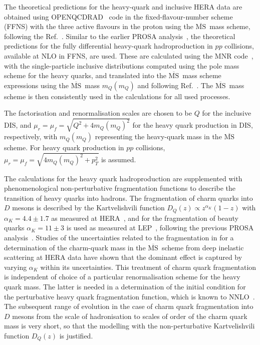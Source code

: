 \documentclass[12pt]{article}
\newcommand{\msbar}{$\overline{\text{MS}}\, $\xspace}
\begin{document}
The theoretical predictions for the heavy-quark and inclusive HERA data are obtained using OPENQCDRAD~\cite{openqcdrad} code in the 
fixed-flavour-number scheme (FFNS) with the three active flavours in the proton using the \msbar mass scheme, following the Ref.~\cite{H1:2018flt}. 
Similar to the earlier PROSA analysis~\cite{Zenaiev:2015rfa}, the theoretical predictions for the fully differential 
heavy-quark hadroproduction in $pp$ collisions, available at NLO in FFNS, are used. These are calculated using 
the MNR code~\cite{Mangano:1991jk}, with the single-particle inclusive distributions computed using the pole mass scheme for the heavy quarks, 
and translated into the \msbar mass scheme expressions using the \msbar mass $m_Q(m_Q)$ and following Ref.~\cite{Dowling:2013baa}.
The \msbar mass scheme is then consistently used in the calculations for all used processes.

The factorisation and renormalisation scales are chosen to be $Q$ for the inclusive DIS, and $\mu_r = \mu_f = \sqrt{Q^2 + 4m_Q(m_Q)^2}$ for the heavy quark production in DIS, respectively, with $m_Q(m_Q)$ representing the heavy-quark mass in the \msbar scheme. 
For heavy quark production in $pp$ collisions, $\mu_r = \mu_f = \sqrt{4m_Q(m_Q)^2+p_T^2}$ is assumed. 

The calculations for the heavy quark hadroproduction are supplemented with phenomenological non-perturbative fragmentation 
functions to describe the transition of heavy quarks into hadrons. The fragmentation of charm quarks into $D$ mesons is 
described by the Kartvelishvili function $D_Q(z) \propto z^{\alpha_K}(1-z)$ 
with $\alpha_K = 4.4 \pm 1.7$ as measured at HERA~\cite{Aaron:2008ac,Chekanov:2008ur}, 
and for the fragmentation of beauty quarks $\alpha_K = 11 \pm 3$ is used as measured at LEP~\cite{Nason:1999zj}, following 
the previous PROSA analysis~\cite{Zenaiev:2015rfa}.
Studies of the uncertainties related to the fragmentation in \cite{Alekhin:2012un} 
for a determination of the charm-quark mass in the \msbar scheme from
deep inelastic scattering at HERA data have shown that the dominant effect is
captured by varying $\alpha_K$ within its uncertainties. 
This treatment of charm quark fragmentation is independent of choice of a particular renormalisation scheme for the heavy quark mass. 
The latter is needed in a determination of the initial condition for the perturbative heavy quark fragmentation
function, which is known to NNLO~\cite{Melnikov:2004bm}.
The subsequent range of evolution in the case of charm quark fragmentation
into $D$ mesons from the scale of hadronisation to scales of order of the
charm quark mass is very short, so that the modelling with the non-perturbative Kartvelishvili function $D_Q(z)$ is justified.
\end{document}
